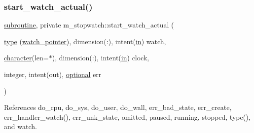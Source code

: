 \subsubsection{\texorpdfstring{start\+\_\+watch\+\_\+actual()}{start\_watch\_actual()}}
{\footnotesize\ttfamily \hyperlink{M__stopwatch_83_8txt_acfbcff50169d691ff02d4a123ed70482}{subroutine}, private m\+\_\+stopwatch\+::start\+\_\+watch\+\_\+actual (\begin{DoxyParamCaption}\item[{\hyperlink{stop__watch_83_8txt_a70f0ead91c32e25323c03265aa302c1c}{type} (\hyperlink{structm__stopwatch_1_1watch__pointer}{watch\+\_\+pointer}), dimension(\+:), intent(\hyperlink{M__journal_83_8txt_afce72651d1eed785a2132bee863b2f38}{in})}]{watch,  }\item[{\hyperlink{option__stopwatch_83_8txt_abd4b21fbbd175834027b5224bfe97e66}{character}(len=$\ast$), dimension(\+:), intent(\hyperlink{M__journal_83_8txt_afce72651d1eed785a2132bee863b2f38}{in})}]{clock,  }\item[{integer, intent(out), \hyperlink{option__stopwatch_83_8txt_aa4ece75e7acf58a4843f70fe18c3ade5}{optional}}]{err }\end{DoxyParamCaption})\hspace{0.3cm}{\ttfamily [private]}}



References do\+\_\+cpu, do\+\_\+sys, do\+\_\+user, do\+\_\+wall, err\+\_\+bad\+\_\+state, err\+\_\+create, err\+\_\+handler\+\_\+watch(), err\+\_\+unk\+\_\+state, omitted, paused, running, stopped, type(), and watch.

\mbox{\label{namespacem__stopwatch_a6068b7fef26a5ab12f7b92a765fe32ca}} 
